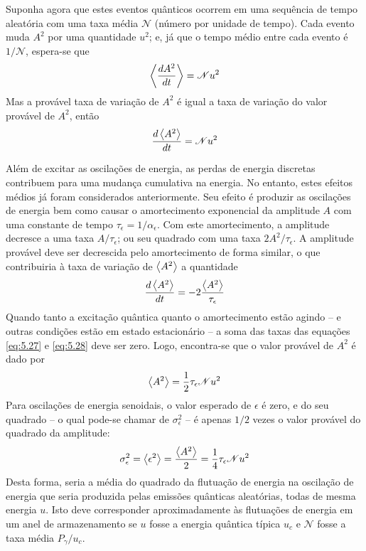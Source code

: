 Suponha agora que estes eventos quânticos ocorrem em uma sequência de tempo aleatória com uma taxa média $\mathscr{N}$ (número por unidade de tempo). Cada evento muda $A^2$ por uma quantidade $u^2$; e, já que o tempo médio entre cada evento é $1/\mathscr{N}$, espera-se que
\begin{align}
	\left< \frac{dA^2}{dt} \right> = \mathscr{N}u^2
\end{align}
Mas a provável taxa de variação de $A^2$ é igual a taxa de variação do valor provável de $A^2$, então
\begin{align}
	\frac{d\left< A^2 \right>}{dt} = \mathscr{N}u^2\label{eq:5.27}
\end{align}

Além de excitar as oscilações de energia, as perdas de energia discretas contribuem para uma mudança cumulativa na energia. No entanto, estes efeitos médios já foram considerados anteriormente. Seu efeito é produzir as oscilações de energia bem como causar o amortecimento exponencial da amplitude $A$ com uma constante de tempo $\tau_\epsilon = 1/\alpha_\epsilon$. Com este amortecimento, a amplitude decresce a uma taxa $A/\tau_\epsilon$; ou seu quadrado com uma taxa $2A^2/\tau_\epsilon$. A amplitude provável deve ser decrescida pelo amortecimento de forma similar, o que contribuiria à taxa de variação de $\left< A^2 \right>$ a quantidade
\begin{align}
	\frac{d\left< A^2 \right>}{dt} = -2\frac{\left< A^2 \right>}{\tau_\epsilon}\label{eq:5.28}
\end{align}
Quando tanto a excitação quântica quanto o amortecimento estão agindo -- e outras condições estão em estado estacionário -- a soma das taxas das equações \eqref{eq:5.27} e \eqref{eq:5.28} deve ser zero. Logo, encontra-se que o valor provável de $A^2$ é dado por
\begin{align}
	\left< A^2 \right> = \frac{1}{2}\tau_\epsilon \mathscr{N}u^2
\end{align}
Para oscilações de energia senoidais, o valor esperado de $\epsilon$ é zero, e do seu quadrado -- o qual pode-se chamar de $\sigma_\epsilon^2$ -- é apenas $1/2$ vezes o valor provável do quadrado da amplitude:
\begin{align}
	\sigma_\epsilon^2 = \left< \epsilon^2 \right> = \frac{\left< A^2 \right>}{2} = \frac{1}{4}\tau_\epsilon \mathscr{N} u^2\label{eq:5.30}
\end{align}
Desta forma, seria a média do quadrado da flutuação de energia na oscilação de energia que seria produzida pelas emissões quânticas aleatórias, todas de mesma energia $u$. Isto deve corresponder aproximadamente às flutuações de energia em um anel de armazenamento se $u$ fosse a energia quântica típica $u_c$ e $\mathscr{N}$ fosse a taxa média $P_\gamma/u_c$.

